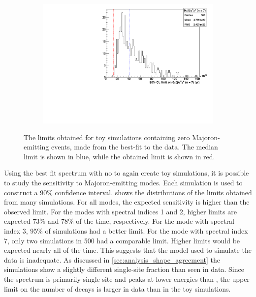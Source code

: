 \documentclass[herrin-thesis.tex]{subfiles}
\begin{document}
\begin{figure}[tbp]
\begin{subfigure}[c]{0.48\textwidth}
	\end{subfigure}\hfill%
	\begin{subfigure}[c]{0.48\textwidth}
	\centering
	\includegraphics[width=\textwidth]{./plots/analysis_bb0nX7_sensitivity.pdf}
	\end{subfigure}
\caption[Sensitivity studies for \(0\nu\beta\beta\chi^0(\chi^0)\)]{The limits obtained for toy simulations containing zero Majoron-emitting events, made from the best-fit to the data. The median limit is shown in blue, while the obtained limit is shown in red.}
\label{fig:analysis_bb0nX_sensitivity}
\end{figure}

Using the best fit spectrum with no \zeronuXpX{} to again create toy simulations, it is possible to study the sensitivity to Majoron-emitting modes. Each simulation is used to construct a 90\% confidence interval.  shows the distributions of the limits obtained from many simulations. For all modes, the expected sensitivity is higher than the observed limit. For the modes with spectral indices 1 and 2, higher limits are expected 73\% and 78\% of the time, respectively. For the mode with spectral index 3, 95\% of simulations had a better limit. For the mode with spectral index 7, only two simulations in 500 had a comparable limit. Higher limits would be expected nearly all of the time. This suggests that the model used to simulate the data is inadequate. As discussed in \cref{sec:analysis_shape_agreement} the simulations show a slightly different single-site fraction than seen in data. Since the \zeronuXX{} spectrum is primarily single site and peaks at lower energies than \twonu{}, the upper limit on the number of decays is larger in data than in the toy simulations.
\end{document}
